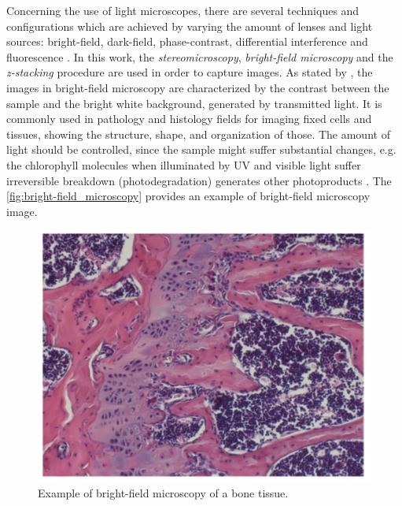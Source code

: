 Concerning the use of light microscopes, there are several techniques and configurations which are achieved by varying the amount of lenses and light sources: bright-field, dark-field, phase-contrast, differential interference and fluorescence \cite{roane2009microscopic}. In this work, the \emph{stereomicroscopy}, \emph{bright-field microscopy} and the \emph{z-stacking} procedure are used in order to capture images. As stated by , the images in bright-field microscopy are characterized by the contrast between the sample and the bright white background, generated by transmitted light. It is commonly used in pathology and histology fields for imaging fixed cells and tissues, showing the structure, shape, and organization of those. The amount of light should be controlled, since the sample might suffer substantial changes, e.g. the chlorophyll molecules when illuminated by UV and visible light suffer irreversible breakdown (photodegradation) generates other photoproducts \cite{petrovic2017clorophyll}. The \autoref{fig:bright-field_microscopy} provides an example of bright-field microscopy image.

\begin{figure}[htb]
	\centering
	\caption{\label{fig:bright-field_microscopy} Example of bright-field microscopy of a bone tissue.}
	\begin{center}
	    \includegraphics[scale=0.3]{images/bright-field_microscopy.png}
	\end{center}
	\centering
\end{figure}

